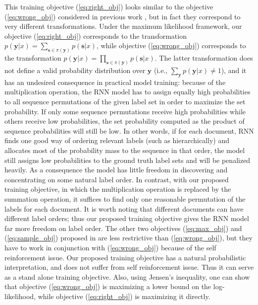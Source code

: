 This training objective (\ref{eq:right_obj}) looks similar to the objective (\ref{eq:wrong_obj}) considered in previous work \cite{vinyals2015order}, but in fact they correspond to very different transformations. Under the maximum likelihood framework, our objective (\ref{eq:right_obj}) corresponds to the transformation $p(\mathbf{y}|x)=\sum_{\mathbf{s}\in \pi(\mathbf{y})} p(\mathbf{s}|x)$, while objective (\ref{eq:wrong_obj}) corresponds to the transformation $p(\mathbf{y}|x)=\prod_{\mathbf{s}\in \pi(\mathbf{y})} p(\mathbf{s}|x)$. The latter transformation does not define a valid probability distribution over $\mathbf{y}$ (i.e., $\sum_{\mathbf{y}} p(\mathbf{y}|x)\neq 1$), and it has an undesired consequence in practical model training: because of the multiplication operation, the RNN model has to assign equally high probabilities to all sequence permutations of the given label set in order to maximize the set probability. If only some sequence permutations receive high probabilities while others receive low probabilities, the set probability computed as the product of sequence probabilities will still be low. In other words, if for each document, RNN finds one good way of ordering relevant labels (such as hierarchically) and allocates most of the probability mass to the sequence in that order, the model still assigns low probabilities to the ground truth label sets and will be penalized heavily. As a consequence the model has little freedom in discovering and concentrating on some natural label order. In contrast, with our proposed training objective, in which the multiplication operation is replaced by the summation operation, it suffices to find only one reasonable permutation of the labels for each document. It is worth noting that different documents can have different label orders; thus our proposed training objective gives the RNN model far more freedom on label order. The other two objectives (\ref{eq:max_obj}) and (\ref{eq:sample_obj}) proposed in \cite{vinyals2015order} are less restrictive than (\ref{eq:wrong_obj}), but they have to work in conjunction with (\ref{eq:wrong_obj}) because of the self reinforcement issue. Our proposed training objective has a natural probabilistic interpretation, and does not suffer from self reinforcement issue. Thus it can serve as a stand alone training objective. Also, using Jensen’s inequality, one can show that objective (\ref{eq:wrong_obj}) is maximizing a lower bound on the log-likelihood, while objective (\ref{eq:right_obj}) is maximizing it directly. 

